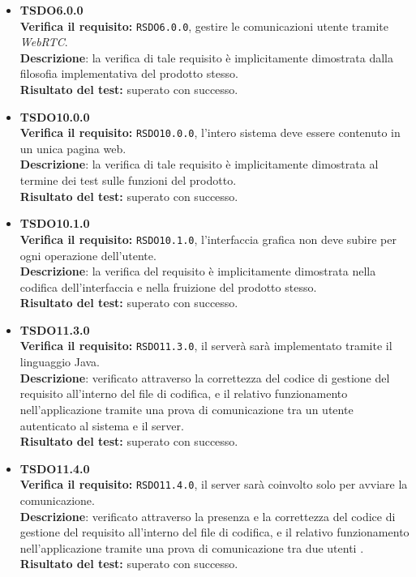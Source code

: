 \begin{itemize}
\item \textbf{TSDO6.0.0}\\
\textbf{Verifica il requisito:} \texttt{RSDO6.0.0}, gestire le comunicazioni utente tramite \textit{WebRTC}.\\
\textbf{Descrizione}: la verifica di tale requisito è implicitamente dimostrata dalla filosofia implementativa del prodotto stesso.\\
\textbf{Risultato del test:} superato con successo.

\item \textbf{TSDO10.0.0}\\
\textbf{Verifica il requisito:} \texttt{RSDO10.0.0}, l'intero sistema deve essere contenuto in un unica pagina web.\\
\textbf{Descrizione}: la verifica di tale requisito è implicitamente dimostrata al termine dei test sulle funzioni del prodotto.\\
\textbf{Risultato del test:} superato con successo.

\item \textbf{TSDO10.1.0}\\
\textbf{Verifica il requisito:} \texttt{RSDO10.1.0}, l'interfaccia grafica non deve subire  per ogni operazione dell'utente.\\
\textbf{Descrizione}: la verifica del requisito è implicitamente dimostrata nella codifica dell'interfaccia e nella fruizione del prodotto stesso.\\
\textbf{Risultato del test:} superato con successo.

\item \textbf{TSDO11.3.0}\\
\textbf{Verifica il requisito:} \texttt{RSDO11.3.0}, il serverà sarà implementato tramite il linguaggio Java.\\
\textbf{Descrizione}: verificato attraverso la correttezza del codice di gestione del requisito all'interno del file di codifica, e il relativo funzionamento nell'applicazione tramite una prova di comunicazione tra un utente autenticato al sistema e il server.\\
\textbf{Risultato del test:} superato con successo.

\item \textbf{TSDO11.4.0}\\
\textbf{Verifica il requisito:} \texttt{RSDO11.4.0}, il server sarà coinvolto solo per avviare la comunicazione.\\
\textbf{Descrizione}: verificato attraverso la presenza e la correttezza del codice di gestione del requisito all'interno del file di codifica, e il relativo funzionamento nell'applicazione tramite una prova di comunicazione tra due utenti .\\
\textbf{Risultato del test:} superato con successo.


\end{itemize}
